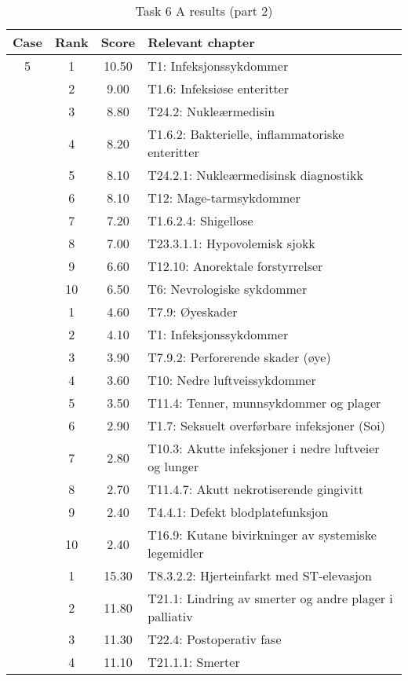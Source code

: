 \begin{table}[htbp] \footnotesize \center
\caption{Task 6 A results (part 2)\label{tab:task6a2}}
\begin{tabular}{c c c l}
    \toprule
    Case & Rank & Score & Relevant chapter \\
    \midrule
    5 & 1 & 10.50 & T1: Infeksjonssykdommer \\
     & 2 & 9.00 & T1.6: Infeksiøse enteritter \\
     & 3 & 8.80 & T24.2: Nukleærmedisin \\
     & 4 & 8.20 & T1.6.2: Bakterielle, inflammatoriske enteritter \\
     & 5 & 8.10 & T24.2.1: Nukleærmedisinsk diagnostikk \\
     & 6 & 8.10 & T12: Mage-tarmsykdommer \\
     & 7 & 7.20 & T1.6.2.4: Shigellose \\
     & 8 & 7.00 & T23.3.1.1: Hypovolemisk sjokk \\
     & 9 & 6.60 & T12.10: Anorektale forstyrrelser \\
     & 10 & 6.50 & T6: Nevrologiske sykdommer \\
	\addlinespace
    6 & 1 & 4.60 & T7.9: Øyeskader \\
     & 2 & 4.10 & T1: Infeksjonssykdommer \\
     & 3 & 3.90 & T7.9.2: Perforerende skader (øye) \\
     & 4 & 3.60 & T10: Nedre luftveissykdommer \\
     & 5 & 3.50 & T11.4: Tenner, munnsykdommer og plager \\
     & 6 & 2.90 & T1.7: Seksuelt overførbare infeksjoner (Soi) \\
     & 7 & 2.80 & T10.3: Akutte infeksjoner i nedre luftveier og lunger \\
     & 8 & 2.70 & T11.4.7: Akutt nekrotiserende gingivitt \\
     & 9 & 2.40 & T4.4.1: Defekt blodplatefunksjon \\
     & 10 & 2.40 & T16.9: Kutane bivirkninger av systemiske legemidler \\
	\addlinespace
    7 & 1 & 15.30 & T8.3.2.2: Hjerteinfarkt med ST-elevasjon \\
     & 2 & 11.80 & T21.1: Lindring av smerter og andre plager i palliativ \\
     & 3 & 11.30 & T22.4: Postoperativ fase \\
     & 4 & 11.10 & T21.1.1: Smerter \\

\end{tabular}
\end{table}
